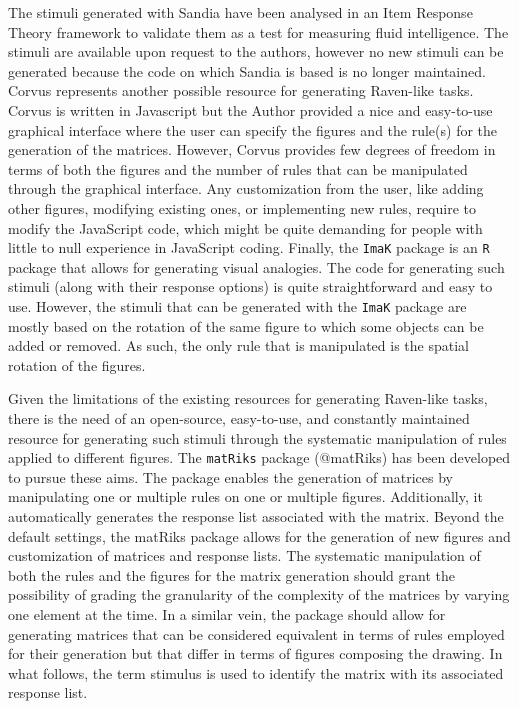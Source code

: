 The stimuli generated with Sandia have been analysed in an Item Response Theory framework to validate them as a test for measuring fluid intelligence.
The stimuli are available upon request to the authors, however no new stimuli can be generated because the code on which Sandia is based is no longer maintained.
Corvus represents another possible resource for generating Raven-like tasks.
Corvus is written in Javascript but the Author provided a nice and easy-to-use graphical interface where the user can specify the figures and the rule(s) for the generation of the matrices.
However, Corvus provides few degrees of freedom in terms of both the figures and the number of rules that can be manipulated through the graphical interface.
Any customization from the user, like adding other figures, modifying existing ones, or implementing new rules, require to modify the JavaScript code, which might be quite demanding for people with little to null experience in JavaScript coding.
Finally, the \texttt{ImaK} package is an \texttt{R} package that allows for generating visual analogies.
The code for generating such stimuli (along with their response options) is quite straightforward and easy to use.
However, the stimuli that can be generated with the \texttt{ImaK} package are mostly based on the rotation of the same figure to which some objects can be added or removed.
As such, the only rule that is manipulated is the spatial rotation of the figures.

Given the limitations of the existing resources for generating Raven-like tasks, there is the need of an open-source, easy-to-use, and constantly maintained resource for generating such stimuli through the systematic manipulation of rules applied to different figures.
The \texttt{matRiks} package (@matRiks) has been developed to pursue these aims.
The package enables the generation of matrices by manipulating one or multiple rules on one or multiple figures.
Additionally, it automatically generates the response list associated with the matrix.
Beyond the default settings, the matRiks package allows for the generation of new figures and customization of matrices and response lists.
The systematic manipulation of both the rules and the figures for the matrix generation should grant the possibility of grading the granularity of the complexity of the matrices by varying one element at the time.
In a similar vein, the package should allow for generating matrices that can be considered equivalent in terms of rules employed for their generation but that differ in terms of figures composing the drawing.
In what follows, the term stimulus is used to identify the matrix with its associated response list.

